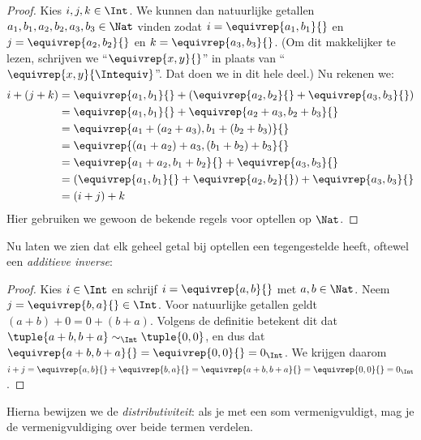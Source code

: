 \documentclass[../../../include/open-logic-section]{subfiles}
\begin{document}
\begin{proof} 
Kies $i, j, k \in \Int$. We kunnen dan natuurlijke getallen $a_1, b_1,
a_2, b_2, a_3, b_3 \in \Nat$ vinden zodat $i = \equivrep{a_1, b_1}{}$ en $j =
\equivrep{a_2,b_2}{}$ en $k = \equivrep{a_3, b_3}{}$. (Om dit
makkelijker te lezen, schrijven we ``$\equivrep{x, y}{}$'' in plaats van
``$\equivrep{x, y}{\Intequiv}$''. Dat doen we in dit hele
deel.) Nu rekenen we:
\begin{align*}
	i + (j + k) &= \equivrep{a_1, b_1}{}+(\equivrep{a_2, b_2}{} + \equivrep{a_3, b_3}{}) \\
	&= \equivrep{a_1,  b_1}{} + \equivrep{a_2+a_3, b_2+b_3}{}\\
	&= \equivrep{a_1 + (a_2 + a_3), b_1 + (b_2 + b_3)}{}\\
	&= \equivrep{(a_1 + a_2) + a_3, (b_1 + b_2) + b_3}{}\\
	&= \equivrep{a_1 + a_2, b_1 + b_2}{} + \equivrep{a_3, b_3}{}\\
	&= (\equivrep{a_1, b_1}{} + \equivrep{a_2, b_2}{}) + \equivrep{a_3, b_3}{}\\
	&= (i+j) + k
\end{align*}
Hier gebruiken we gewoon de bekende regels voor optellen op $\Nat$.
\end{proof}
Nu laten we zien dat elk geheel getal bij optellen een tegengestelde
heeft, oftewel een \emph{additieve inverse}:
\begin{proof}
Kies $i \in \Int$ en schrijf $i = \equivrep{a,b}{}$ met $a,b \in
\Nat$. Neem $j = \equivrep{b,a}{} \in
\Int$. Voor natuurlijke getallen geldt $(a+b) + 0 = 0 + (b+a)$.
Volgens de definitie betekent dit dat $\tuple{a+b, b+a} \sim_\Int
\tuple{0,0}$, en dus dat $\equivrep{a+b, b+a}{} = \equivrep{0, 0}{}
= 0_\Int$. We krijgen daarom $i + j =
\equivrep{a,b}{}+\equivrep{b,a}{}=\equivrep{a+b, b+a}{}= \equivrep{0,
0}{} = 0_\Int$.
\end{proof}
Hierna bewijzen we de \emph{distributiviteit}: als je met een som
vermenigvuldigt, mag je de vermenigvuldiging over beide termen
verdelen.
\end{document}
